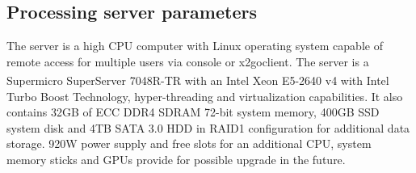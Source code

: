 \subsection{Processing server parameters}\label{sec:server_param}

	The server is a high CPU computer with Linux operating system capable of remote access for multiple users via console or x2goclient. The server is a Supermicro SuperServer 7048R-TR with an Intel\textsuperscript{\tiny\textregistered} Xeon\textsuperscript{\tiny\textregistered} E5-2640 v4 with Intel\textsuperscript{\tiny\textregistered} Turbo Boost Technology, hyper-threading and virtualization capabilities. It also contains 32GB of ECC DDR4 SDRAM 72-bit system memory, 400GB SSD system disk and 4TB SATA 3.0 HDD in RAID1 configuration for additional data storage. 920W power supply and free slots for an additional CPU, system memory sticks and GPUs provide for possible upgrade in the future.